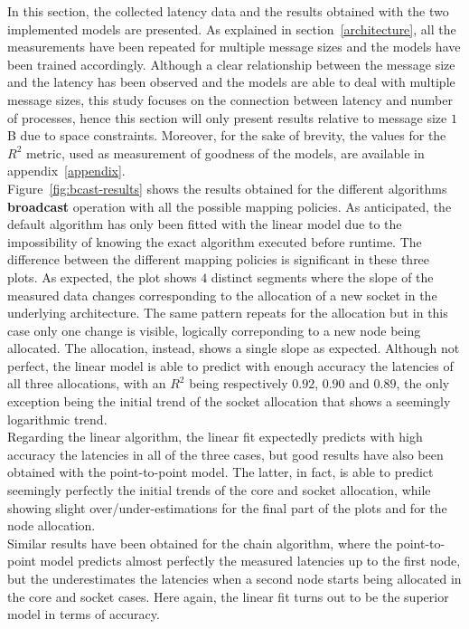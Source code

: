 \documentclass[../main.tex]{subfiles}
\begin{document}
In this section, the collected latency data and the results obtained with the two implemented models are presented. As explained in section~\ref{architecture}, all the measurements have been repeated for multiple message sizes and the models have been trained accordingly. Although a clear relationship between the message size and the latency has been observed and the models are able to deal with multiple message sizes, this study focuses on the connection between latency and number of processes, hence this section will only present results relative to message size $1$ B due to space constraints.
Moreover, for the sake of brevity, the values for the $R^2$ metric, used as measurement of goodness of the models, are available in appendix~\ref{appendix}.\\
Figure~\ref{fig:bcast-results} shows the results obtained for the different algorithms \textbf{broadcast} operation with all the possible mapping policies. 
As anticipated, the default algorithm has only been fitted with the linear model due to the impossibility of knowing the exact algorithm executed before runtime. The difference between the different mapping policies is significant in these three plots. As expected, the  plot shows $4$ distinct segments where the slope of the measured data changes corresponding to the allocation of a new socket in the underlying architecture. The same pattern repeats for the  allocation but in this case only one change is visible, logically correponding to a new node being allocated. The  allocation, instead, shows a single slope as expected. Although not perfect, the linear model is able to predict with enough accuracy the latencies of all three allocations, with an $R^2$ being respectively $0.92$, $0.90$ and $0.89$, the only exception being the initial trend of the socket allocation that shows a seemingly logarithmic trend.\\
Regarding the linear algorithm, the linear fit expectedly predicts with high accuracy the latencies in all of the three cases, but good results have also been obtained with the point-to-point model. The latter, in fact, is able to predict seemingly perfectly the initial trends of the core and socket allocation, while showing slight over/under-estimations for the final part of the plots and for the node allocation.\\
Similar results have been obtained for the chain algorithm, where the point-to-point model predicts almost perfectly the measured latencies up to the first node, but the underestimates the latencies when a second node starts being allocated in the core and socket cases. Here again, the linear fit turns out to be the superior model in terms of accuracy.\\
\end{document}
